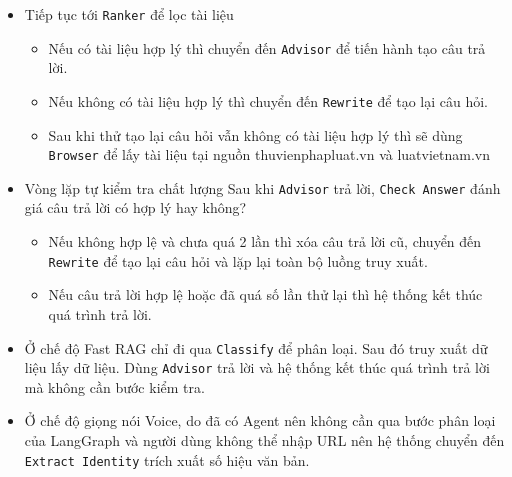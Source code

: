 \begin{itemize}
\begin{itemize}


\item Tài liệu người dùng (Milvus)
\item Tóm tắt tài liệu (Cloudflare R2)
\item Văn bản pháp luật (Pinecone)
\item Dữ liệu pháp điển (Qdrant)

\end{itemize}


\item Tiếp tục tới \texttt{Ranker} để lọc tài liệu


\begin{itemize}


\item Nếu có tài liệu hợp lý
thì
chuyển đến \texttt{Advisor}
để tiến hành tạo câu trả lời.


\item Nếu không có tài liệu hợp lý
thì
chuyển đến \texttt{Rewrite}
để tạo lại câu hỏi.


\item Sau khi thử tạo lại câu hỏi
vẫn không có tài liệu hợp lý
thì sẽ dùng \texttt{Browser}
để lấy tài liệu
tại nguồn
thuvienphapluat.vn và luatvietnam.vn


\end{itemize}


\item Vòng lặp tự kiểm tra chất lượng
Sau khi \texttt{Advisor} trả lời,
\texttt{Check Answer} đánh giá câu trả lời có hợp lý hay không?


\begin{itemize}


\item Nếu không hợp lệ và chưa quá 2 lần
thì xóa câu trả lời cũ,
chuyển đến \texttt{Rewrite}
để tạo lại câu hỏi
và
lặp lại toàn bộ luồng truy xuất.

\item Nếu câu trả lời hợp lệ hoặc đã quá số lần thử lại
thì
hệ thống kết thúc quá trình trả lời.
\end{itemize}


\item Ở chế độ Fast RAG
chỉ đi qua \texttt{Classify} để phân loại.
Sau đó truy xuất dữ liệu lấy dữ liệu.
Dùng \texttt{Advisor} trả lời
và
hệ thống kết thúc quá trình trả lời
mà không cần bước kiểm tra.


\item Ở chế độ giọng nói Voice,
do đã có Agent nên không cần qua bước phân loại của LangGraph
và người dùng không thể nhập URL nên hệ thống chuyển đến \texttt{Extract Identity} trích xuất số hiệu văn bản.


\end{itemize}


